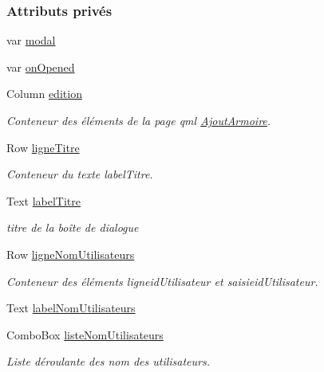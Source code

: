 \subsubsection*{Attributs privés}
\begin{DoxyCompactItemize}
\item 
var \hyperlink{class_suppression_utilisateur_aff96bb360558207092569fc61a66f8ae}{modal}
\item 
var \hyperlink{class_suppression_utilisateur_ad40038f9daf10f8a3ef3fef0d5ffbb32}{on\+Opened}
\item 
Column \hyperlink{class_suppression_utilisateur_af74a76040aca7a060cb44558c9e56d57}{edition}
\begin{DoxyCompactList}\small\item\em Conteneur des éléments de la page qml \hyperlink{class_ajout_armoire}{Ajout\+Armoire}. \end{DoxyCompactList}\item 
Row \hyperlink{class_suppression_utilisateur_aee2a99d35b752f9511ad40095e6e9de5}{ligne\+Titre}
\begin{DoxyCompactList}\small\item\em Conteneur du texte label\+Titre. \end{DoxyCompactList}\item 
Text \hyperlink{class_suppression_utilisateur_a3bd3b798ca87dbdd2f86445cba0a2e3b}{label\+Titre}
\begin{DoxyCompactList}\small\item\em titre de la boîte de dialogue \end{DoxyCompactList}\item 
Row \hyperlink{class_suppression_utilisateur_af038a2284ece5110cbb69c883ae8e17e}{ligne\+Nom\+Utilisateurs}
\begin{DoxyCompactList}\small\item\em Conteneur des éléments ligneid\+Utilisateur et saisieid\+Utilisateur. \end{DoxyCompactList}\item 
Text \hyperlink{class_suppression_utilisateur_a79af68df550e6c97c479a0b53e22f1bd}{label\+Nom\+Utilisateurs}
\item 
Combo\+Box \hyperlink{class_suppression_utilisateur_a733b8f3f0a250b9371d91a84d7d52d82}{liste\+Nom\+Utilisateurs}
\begin{DoxyCompactList}\small\item\em Liste déroulante des nom des utilisateurs. \end{DoxyCompactList}\item 

\end{DoxyCompactItemize}
